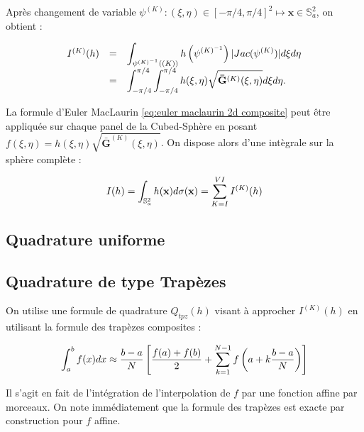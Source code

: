 Après changement de variable $\psi^{(K)} : (\xi, \eta) \in [-\pi/4, \pi/4]^2 \mapsto \mathbf{x} \in \mathbb{S}_a^2$, on obtient :

\begin{equation}
\begin{array}{rcl}
I^{(K)}(h) & = &  \displaystyle\int_{\psi^{(K)^{-1}}\left((K)\right)}  h\left( \psi^{(K)^{-1}}\right) |Jac ( \psi^{(K)} )|d\xi d\eta \\
& = & \displaystyle\int_{-\pi/4}^{\pi/4}\displaystyle\int_{-\pi/4}^{\pi/4} h(\xi, \eta) \sqrt{\mathbf{\bar{G}}^{(K)}(\xi, \eta)} d \xi d \eta.
\end{array}
\end{equation}

La formule d'Euler MacLaurin \eqref{eq:euler maclaurin 2d composite} peut être appliquée sur chaque panel de la Cubed-Sphère en posant $f(\xi,\eta)=h(\xi,\eta)\sqrt{\mathbf{\bar{G}}^{(K)}(\xi, \eta)}$. On dispose alors d'une intègrale sur la sphère complète :

\begin{equation}
I(h)=\displaystyle\int_{\mathbb{S}_a^2} h(\mathbf{x})d\sigma(\mathbf{x}) = \displaystyle\sum\limits_{K = I}^{VI} I^{(K)}(h)
\end{equation}

\subsection{Quadrature uniforme}  %



\subsection{Quadrature de type Trapèzes}  %

On utilise une formule de quadrature $Q_{tpz}(h)$ visant à approcher $I^{(K)}(h)$ en utilisant la formule des trapèzes composites :

\begin{equation}
\displaystyle\int_{a}^b f(x)dx \approx \dfrac{b-a}{N} \left[ \dfrac{f(a)+f(b)}{2} + \displaystyle\sum\limits_{k=1}^{N-1} f\left( a+k \dfrac{b-a}{N} \right) \right]
\label{eq:trapezes composites}
\end{equation}

Il s'agit en fait de l'intégration de l'interpolation de $f$ par une fonction affine par morceaux. On note immédiatement que la formule des trapèzes est exacte par construction pour $f$ affine.

